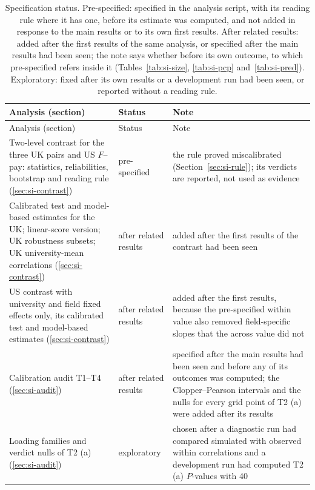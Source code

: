 \documentclass[11pt]{article}
\begin{document}
\begingroup
\scriptsize
\renewcommand{\arraystretch}{1.1}
\setlength{\tabcolsep}{3pt}
\setlength{\LTcapwidth}{\textwidth}
\begin{longtable}{@{}>{\raggedright\arraybackslash}p{5.6cm}>{\raggedright\arraybackslash}p{2.0cm}>{\raggedright\arraybackslash}p{8.2cm}@{}}
\caption{Specification status. Pre-specified: specified in the analysis script, with its reading rule where it has
one, before its estimate was computed, and not added in response to the main results or to its own first results.
After related results: added after the first results of the same analysis, or specified after the main results had
been seen; the note says whether before its own outcome, to which pre-specified refers inside it
(Tables~\ref{tab:si-size}, \ref{tab:si-pcp} and~\ref{tab:si-pred}). Exploratory: fixed after its own results or a
development run had been seen, or reported without a reading rule.}\label{tab:si-status}\\
\toprule
Analysis (section) & Status & Note \\
\midrule
\endfirsthead
\toprule
Analysis (section) & Status & Note \\
\midrule
\endhead
\bottomrule
\endlastfoot
Two-level contrast for the three UK pairs and US $F$--pay: statistics, reliabilities, bootstrap and reading rule
(\ref{sec:si-contrast}) & pre-specified & the rule proved miscalibrated (Section~\ref{sec:si-rule}); its verdicts are
reported, not used as evidence \\
Calibrated test and model-based estimates for the UK; linear-score version; UK robustness subsets; UK
university-mean correlations (\ref{sec:si-contrast}) & after related results & added after the first results of the
contrast had been seen \\
US contrast with university and field fixed effects only, its calibrated test and model-based estimates
(\ref{sec:si-contrast}) & after related results & added after the first results, because the pre-specified within
value also removed field-specific slopes that the across value did not \\
Calibration audit T1--T4 (\ref{sec:si-audit}) & after related results & specified after the main results had been
seen and before any of its outcomes was computed; the Clopper--Pearson intervals and the nulls for every grid point
of T2 (a) were added after its results \\
Loading families and verdict nulls of T2 (a) (\ref{sec:si-audit}) & exploratory & chosen after a diagnostic run had
compared simulated with observed within correlations and a development run had computed T2 (a) $P$-values with 40

\end{longtable}
\end{document}
